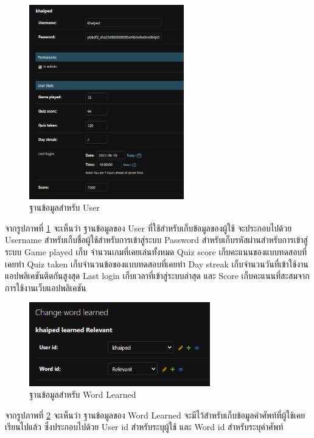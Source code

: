 \documentclass[12pt,oneside,openright,a4paper]{cpe-thai-project}
\begin{document}
\pagebreak
\begin{figure}[!h]\centering
	\includegraphics[width=0.6\textwidth, keepaspectratio=true]{image/chap4/DB/user.png}
	\caption{{ฐานข้อมูลสำหรับ User}}\label{fig:chap4User}
\end{figure}
\hspace{1cm}
จากรูปภาพที่ \ref{fig:chap4User} จะเห็นว่า ฐานข้อมูลของ User ที่ใช้สำหรับเก็บข้อมูลของผู้ใช้
จะประกอบไปด้วย Username สำหรับเก็บชื่อผู้ใช้สำหรับการเข้าสู่ระบบ
Password สำหรับเก็บรหัสผ่านสำหรับการเข้าสู่ระบบ Game played เก็บ จํานวนเกมที่เคยเล่นทั้งหมด
Quiz score เก็บคะแนนของแบบทดสอบที่เคยทํา Quiz taken เก็บจํานวนข้อของแบบทดสอบที่เคยทํา
Day streak เก็บจํานวนวันที่เข้าใช้งานแอปพลิเคชันติดกันสูงสุด Last login เก็บเวลาที่เข้าสู่ระบบล่าสุด
และ Score เก็บคะแนนที่สะสมจากการใช้งานเว็บแอปพลิเคชัน

\pagebreak
\begin{figure}[!h]\centering
	\includegraphics[width=0.7\textwidth, keepaspectratio=true]{image/chap4/DB/word learned.png}
	\caption{{ฐานข้อมูลสำหรับ Word Learned}}\label{fig:chap4WordLearned}
\end{figure}
\hspace{1cm}
จากรูปภาพที่ \ref{fig:chap4WordLearned} จะเห็นว่า ฐานข้อมูลของ Word Learned จะมีไว้สำหรับเก็บข้อมูลคำศัพท์ที่ผู้ใช้เคยเรียนไปแล้ว
ซึ่งประกอบไปด้วย User id สำหรับระบุผู้ใช้ และ Word id สำหรับระบุคำศัพท์
\end{document}
